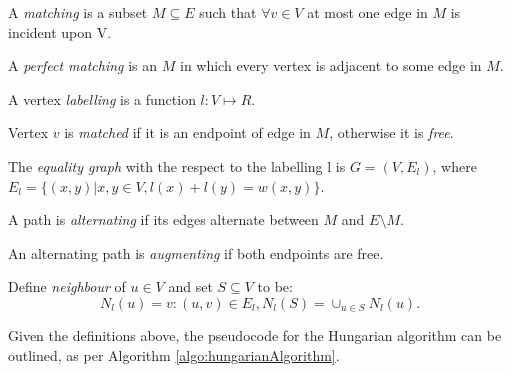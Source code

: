 \begin{definition}
A \emph{matching} is a subset $M \subseteq E$ such that $\forall v \in V$ at most one edge in $M$ is incident upon V.
\end{definition}

\begin{definition}
A \emph{perfect matching} is an $M$ in which every vertex is adjacent to some edge in $M$.
\end{definition}

\begin{definition}
A vertex \emph{labelling} is a function $l:V\mapsto R.$
\end{definition}

\begin{definition}
Vertex $v$ is \emph{matched} if it is an endpoint of edge in $M$, otherwise it is \emph{free}.
\end{definition}

\begin{definition}
The \emph{equality graph} with the respect to the labelling l is $G=(V,E_l)$, where $E_l=\{(x,y)|x,y \in V, l(x)+l(y)=w(x,y)\}.$
\end{definition}

\begin{definition}
A path is \emph{alternating} if its edges alternate between $M$ and $E \setminus M$.
\end{definition}

\begin{definition}
An alternating path is \emph{augmenting} if both endpoints are free.
\end{definition}

\begin{definition}
Define \emph{neighbour} of $u \in V$ and set $S\subseteq V$ to be:
\begin{equation}
N_l(u)={v:(u,v)\in E_l}, N_l(S)=\cup_{u\in S}N_l(u).
\label{eq:nlu}
\end{equation}
\end{definition}
Given the definitions above, the pseudocode for the Hungarian algorithm can be outlined, as per Algorithm \ref{algo:hungarianAlgorithm}.


